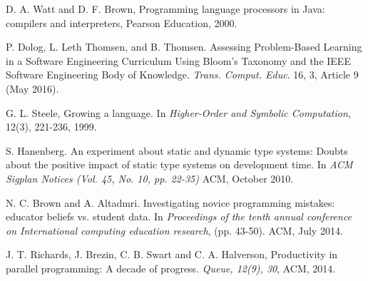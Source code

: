 \documentclass[preprint,10pt]{sigplanconf}
\begin{document}
\begin{thebibliography}{}
D. A. Watt and D. F. Brown, \newblock Programming language processors in Java: compilers and interpreters, \newblock Pearson Education, 2000.

P. Dolog, L. Leth Thomsen, and B. Thomsen. \newblock Assessing Problem-Based Learning in a Software Engineering Curriculum Using Bloom’s Taxonomy and the IEEE Software Engineering Body of Knowledge. \newblock \emph{Trans. Comput. Educ}. 16, 3, Article 9 (May 2016).

G. L. Steele, \newblock Growing a language. \newblock In \emph{Higher-Order and Symbolic Computation}, 12(3), 221-236, 1999.

S. Hanenberg. \newblock An experiment about static and dynamic type systems: Doubts about the positive impact of static type systems on development time. \newblock In \emph{ACM Sigplan Notices (Vol. 45, No. 10, pp. 22-35)} ACM, October 2010.

N. C. Brown and A. Altadmri. \newblock Investigating novice programming mistakes: educator beliefs vs. student data. \newblock In \emph{Proceedings of the tenth annual conference on International computing education research}, (pp. 43-50). ACM, July 2014.

J. T. Richards, J.  Brezin, C. B. Swart and C. A. Halverson, \newblock Productivity in parallel programming: A decade of progress. \newblock \emph{Queue, 12(9), 30}, ACM, 2014.



\end{thebibliography}
\end{document}
